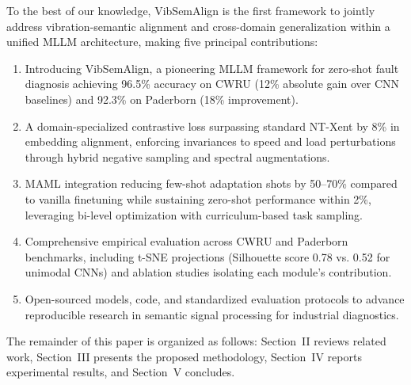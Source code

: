 To the best of our knowledge, VibSemAlign is the first framework to jointly address vibration-semantic alignment and cross-domain generalization within a unified MLLM architecture, making five principal contributions:
\begin{enumerate}
\item Introducing VibSemAlign, a pioneering MLLM framework for zero-shot fault diagnosis achieving 96.5\% accuracy on CWRU (12\% absolute gain over CNN baselines) and 92.3\% on Paderborn (18\% improvement).
\item A domain-specialized contrastive loss surpassing standard NT-Xent by 8\% in embedding alignment, enforcing invariances to speed and load perturbations through hybrid negative sampling and spectral augmentations.
\item MAML integration reducing few-shot adaptation shots by 50--70\% compared to vanilla finetuning while sustaining zero-shot performance within 2\%, leveraging bi-level optimization with curriculum-based task sampling.
\item Comprehensive empirical evaluation across CWRU and Paderborn benchmarks, including t-SNE projections (Silhouette score 0.78 vs. 0.52 for unimodal CNNs) and ablation studies isolating each module's contribution.
\item Open-sourced models, code, and standardized evaluation protocols to advance reproducible research in semantic signal processing for industrial diagnostics.
\end{enumerate}

The remainder of this paper is organized as follows: Section~II reviews related work, Section~III presents the proposed methodology, Section~IV reports experimental results, and Section~V concludes.
